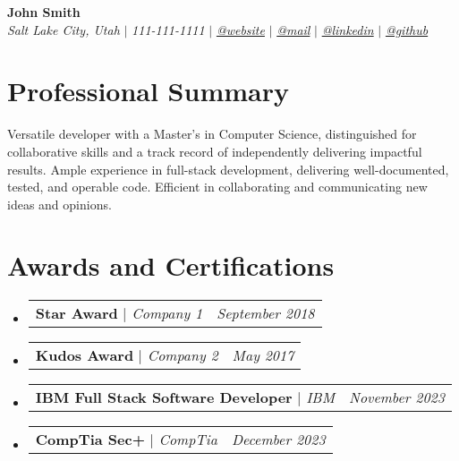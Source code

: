 \documentclass[letterpaper,10pt]{article}
\makeatletter
\newcommand{\sectionspace}{
\vspace{-20pt}
}
\newcommand{\subheadingtitlevspace}{
\vspace{-3pt}
}
\newcommand{\titleItem}[1]{
  \textbf{#1}
}
\newcommand{\resumeProjectHeading}[2]{
    \item
    \begin{tabular*}{0.97\textwidth}{l@{\extracolsep{\fill}}r}
      #1 & \textit{ #2} \\
    \end{tabular*}\vspace{-9pt}
}
\newcommand{\resumeSubHeadingListStart}{\subheadingtitlevspace\begin{itemize}[leftmargin=0.15in, label={}]}
\newcommand{\resumeSubHeadingListEnd}{\end{itemize}}
\makeatother
\begin{document}

\begin{flushleft}
    \textbf{\large John Smith} \\    
    \textit{Salt Lake City, Utah} $|$ 
    \textit{111-111-1111} $|$  
    \href{https://website}{{\textit{@website}}} $|$
    \href{mailto:email@email.com}{{\textit{@mail}}} $|$ 
    \href{https://linkedin.com/in/username}{{\textit{@linkedin}}} $|$
    \href{https://github.com/sansquoi}{{\textit{@github}}}
    \vspace{-8pt}
\end{flushleft}


\section{Professional Summary}
\vspace{-3pt}
\begin{itemize}[leftmargin=0.15in, label={}]
    {\item{
     {Versatile developer with a Master's in Computer Science, distinguished for collaborative skills and a track record of independently delivering impactful results. Ample experience in full-stack development, delivering well-documented, tested, and operable code. Efficient in collaborating and communicating new ideas and opinions.} \\      
    }}
 \end{itemize}
 \sectionspace



\section{Awards and Certifications}
    \resumeSubHeadingListStart
      \resumeProjectHeading
          {\titleItem{Star Award} \emph{ $|$ Company 1}}{September 2018}
      \resumeProjectHeading
          {\titleItem{Kudos Award} \emph{ $|$ Company 2}}{May 2017}
      \resumeProjectHeading
          {\titleItem{IBM Full Stack Software Developer} \emph{$|$ IBM}}{November 2023}
          \resumeProjectHeading
          {\titleItem{CompTia Sec+} \emph{$|$ CompTia}}{December 2023}
    \resumeSubHeadingListEnd
\end{document}
